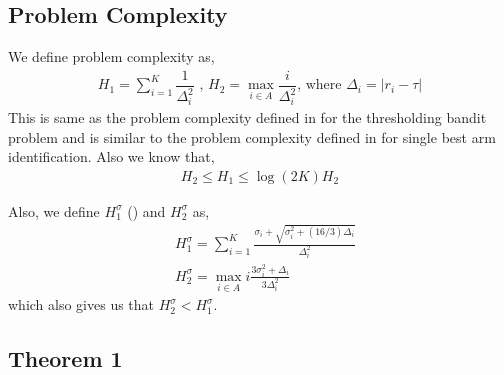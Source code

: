 

\subsection{Problem Complexity}

We define problem complexity as,
\begin{align*}
H_{1} = \sum_{i=1}^{K}\dfrac{1}{\Delta_{i}^{2}} \text{ ,   } H_{2}=\max_{i\in A}\dfrac{i}{{\Delta_{i}^{2}}} \text{, where } \Delta_{i}=|r_{i}-\tau|
\end{align*}
This is same as the problem complexity defined in \cite{locatelli2016optimal} for the thresholding bandit problem and is similar to the problem complexity defined in \cite{audibert2010best} for single best arm identification. Also we know that,
\begin{align*}
H_{2}\leq H_{1}\leq \log(2K)H_{2}
\end{align*}

Also, we define $H_{1}^{\sigma}$ (\cite{gabillon2011multi}) and $H_{2}^{\sigma}$ as,
\begin{align*}
& H_{1}^{\sigma}=\sum_{i=1}^{K}\frac{\sigma_{i}+\sqrt{\sigma_{i}^{2}+(16/3)\Delta_{i}}}{\Delta_{i}^{2}}\\
& H_{2}^{\sigma}=\max_{i\in A} i\frac{3\sigma_{i}^{2} + \Delta_i}{3\Delta_i^{2}}
\end{align*}
which also gives us that $H_{2}^{\sigma} < H_{1}^{\sigma}$.


\subsection{Theorem 1}

